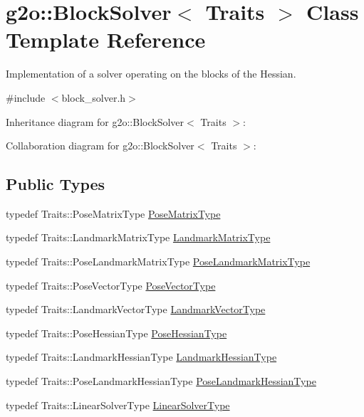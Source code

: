 \hypertarget{classg2o_1_1BlockSolver}{}\section{g2o\+:\+:Block\+Solver$<$ Traits $>$ Class Template Reference}
\label{classg2o_1_1BlockSolver}


Implementation of a solver operating on the blocks of the Hessian.  




{\ttfamily \#include $<$block\+\_\+solver.\+h$>$}



Inheritance diagram for g2o\+:\+:Block\+Solver$<$ Traits $>$\+:


Collaboration diagram for g2o\+:\+:Block\+Solver$<$ Traits $>$\+:
\subsection*{Public Types}
\begin{DoxyCompactItemize}
\item 
typedef Traits\+::\+Pose\+Matrix\+Type \hyperlink{classg2o_1_1BlockSolver_a8c7c43d361bd31e3e0353889ba703bc0}{Pose\+Matrix\+Type}
\item 
typedef Traits\+::\+Landmark\+Matrix\+Type \hyperlink{classg2o_1_1BlockSolver_afd898a666343291129d37a979e23ded6}{Landmark\+Matrix\+Type}
\item 
typedef Traits\+::\+Pose\+Landmark\+Matrix\+Type \hyperlink{classg2o_1_1BlockSolver_a96bf60b923f816086cd2f24de38736ec}{Pose\+Landmark\+Matrix\+Type}
\item 
typedef Traits\+::\+Pose\+Vector\+Type \hyperlink{classg2o_1_1BlockSolver_a65d51b9281e2e2597df05eb00801ee76}{Pose\+Vector\+Type}
\item 
typedef Traits\+::\+Landmark\+Vector\+Type \hyperlink{classg2o_1_1BlockSolver_a19ade5e432f32e46557192ae75074304}{Landmark\+Vector\+Type}
\item 
typedef Traits\+::\+Pose\+Hessian\+Type \hyperlink{classg2o_1_1BlockSolver_a0e7f862860a1e3391cec3cfaf69c48be}{Pose\+Hessian\+Type}
\item 
typedef Traits\+::\+Landmark\+Hessian\+Type \hyperlink{classg2o_1_1BlockSolver_a465b1252905d90fd69b4243716620c45}{Landmark\+Hessian\+Type}
\item 
typedef Traits\+::\+Pose\+Landmark\+Hessian\+Type \hyperlink{classg2o_1_1BlockSolver_aed8b44e394d2f19ca03c87adf90cc97c}{Pose\+Landmark\+Hessian\+Type}
\item 
typedef Traits\+::\+Linear\+Solver\+Type \hyperlink{classg2o_1_1BlockSolver_a717fa8cb1dd5a212e41d8ebef67955e6}{Linear\+Solver\+Type}
\end{DoxyCompactItemize}
